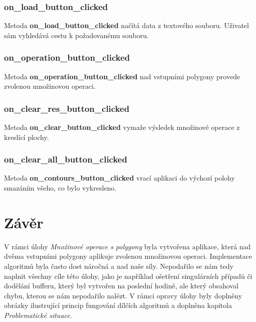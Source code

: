 \documentclass[a4paper, 12pt]{article}
\begin{document}
\subsubsection*{on\_load\_button\_clicked}
Metoda \textbf{on\_load\_button\_clicked} načítá data z textového souboru. Uživatel sám vyhledává cestu k požadovanému souboru.

\subsubsection*{on\_operation\_button\_clicked}
Metoda \textbf{on\_operation\_button\_clicked} nad vstupními polygony provede zvolenou mno\-ži\-no\-vou operaci.

\subsubsection*{on\_clear\_res\_button\_clicked}
Metoda \textbf{on\_clear\_button\_clicked} vymaže výsledek množinové operace z kreslící plochy. 

\subsubsection*{on\_clear\_all\_button\_clicked}
Metoda \textbf{on\_contours\_button\_clicked} vrací aplikaci do výchozí polohy smazáním všeho, co bylo vykresleno. 



\clearpage
\section{Závěr}
V rámci úlohy \textit{Množinové operace s polygony} byla vytvořena aplikace, která nad dvěma vstupními polygony aplikuje zvolenou množinovou operaci. Implementace algoritmů byla často dost náročná a nad naše síly. Nepodařilo se nám tedy naplnit všechny cíle této úlohy, jako je například ošetření singulárních případů či dodělání bufferu, který byl vytvořen na poslední hodině, ale který obsahoval chybu, kterou se nám nepodařilo nalézt. V rámci opravy úlohy byly doplněny obrázky ilustrující princip fungování dílčích algoritmů a doplněna kapitola \textit{Problematické situace}.\\
\end{document}

